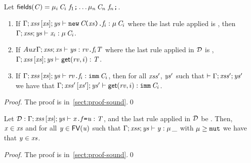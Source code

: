 {\begin{lemma}\label{lemma:fieldAccess}
Let  $\textsf{fields}(\mathit{C})=\mu_i\,\mathit{C}_i\ \mathit{f}_1\texttt{;}\ldots\mu_n\,\mathit{C}_n\ \mathit{f}_n\texttt{;}$.
\begin{enumerate} 
  \item If $\Gamma;\mathit{xss}\,[\mathit{xs}];\mathit{ys}\vdash \texttt{new}\,\mathit{C}\!\texttt{(}\mathit{xs}\texttt{)}\texttt{.}\mathit{f}_i:\mu\,\mathit{C}_i$ where the last rule applied is , then $\Gamma;\mathit{xss};\mathit{ys}\vdash \mathit{x}_i:\mu\,\mathit{C}_i$.
  \item If $Aux\Gamma;\mathit{xss};\mathit{xs}\vdash \mathit{ys}:\mathit{rv}\texttt{.}\mathit{f}_i{\mathit{T}}$ where the last rule applied in ${\cal D}$ is ,
$\Gamma;\mathit{xss}\,[\mathit{xs}];\mathit{ys}\vdash \textsf{get}(\mathit{rv},i):\mathit{T}$.
\item If $\Gamma;\mathit{xss}\,[\mathit{xs}];\mathit{ys}\vdash \mathit{rv}\texttt{.}\mathit{f}_i:\texttt{imm}\,\mathit{C}_i$, then for all $\mathit{xss}'$, $\mathit{ys}'$ such that $\vdash\Gamma;\mathit{xss}';\mathit{ys}'$ we have that
$\Gamma;\mathit{xss}'\,[\mathit{xs}'];\mathit{ys}'\vdash \textsf{get}(\mathit{rv},i):\texttt{imm}\,\mathit{C}_i$.
\end{enumerate}
\end{lemma}
\begin{proof}
The proof is in~\ref{sect:proof-sound}.\qed
\end{proof}
    \begin{lemma}\label{lemma:fieldAssign}
Let ${\cal D}:\Gamma;\mathit{xss}\,[\mathit{xs}];\mathit{ys}\vdash \mathit{x}\texttt{.}\mathit{f}\texttt{=}\mathit{u}:\mathit{T}$, and the
last rule applied in ${\cal D}$ be . 
Then, $\mathit{x}\in\mathit{xs}$ and for all 
$\mathit{y}\in\textsf{FV}(\mathit{u})$ such that ${\Gamma};\mathit{xss};\mathit{ys}\vdash \mathit{y}:\mu\,\_$ with
$\mu\geq\texttt{mut}$ we have that $\mathit{y}\in\mathit{xs}$.
\end{lemma}
\begin{proof}
The proof is in~\ref{sect:proof-sound}.\qed
\end{proof}

}
